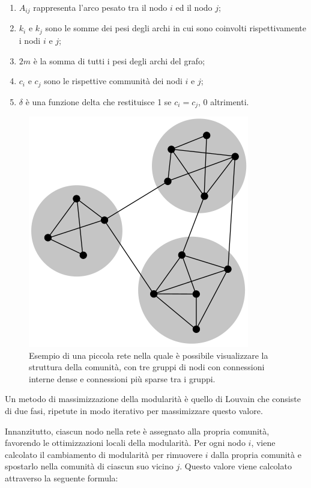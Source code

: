 \begin{enumerate}[label=(\roman*)]
  
\item \( A_{ij} \) rappresenta l'arco pesato tra il nodo \( i \) ed il nodo \( j \);
\item \( k_i \) e \( k_j \) sono le somme dei pesi degli archi in cui sono coinvolti rispettivamente i nodi \( i \) e \( j \);
\item \( 2m \) {\`e} la somma di tutti i pesi degli archi del grafo;
\item \( c_i \) e \( c_j \) sono le rispettive communit{\`a} dei nodi \( i \) e \( j \);
\item $\delta$ {\`e} una funzione delta che restituisce 1 se \( c_i = c_j \), 0 altrimenti. 

\end{enumerate}

\begin{figure}\centering
\includegraphics[scale=0.50]{img/community}
\caption{Esempio di una piccola rete nella quale {\`e} possibile visualizzare la struttura della comunit{\`a}, con tre gruppi di nodi con connessioni interne dense e connessioni pi{\`u} sparse tra i gruppi.}
\end{figure}

Un metodo di massimizzazione della modularit{\`a} {\`e} quello di Louvain \cite{louvain} che consiste di due fasi, ripetute in modo iterativo per massimizzare questo valore.

Innanzitutto, ciascun nodo nella rete {\`e} assegnato alla propria comunit{\`a}, favorendo le ottimizzazioni locali della modularit{\`a}. Per ogni nodo \( i \), viene calcolato il cambiamento di modularit{\`a} per rimuovere \( i \) dalla propria comunit{\`a} e spostarlo nella comunit{\`a} di ciascun suo vicino \( j \). Questo valore viene calcolato attraverso la seguente formula:

